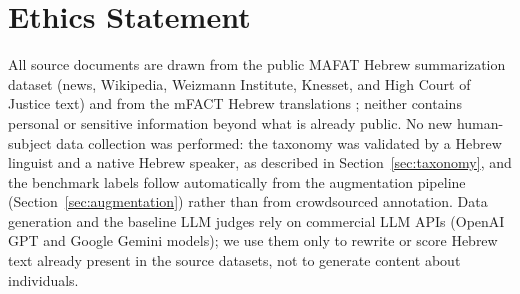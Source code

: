 \documentclass[11pt]{article}
\begin{document}
\section*{Ethics Statement}
All source documents are drawn from the public MAFAT Hebrew summarization dataset \citep{mafat_dataset} (news, Wikipedia, Weizmann Institute, Knesset, and High Court of Justice text) and from the mFACT Hebrew translations \citep{qiu2023detecting}; neither contains personal or sensitive information beyond what is already public. No new human-subject data collection was performed: the taxonomy was validated by a Hebrew linguist and a native Hebrew speaker, as described in Section~\ref{sec:taxonomy}, and the benchmark labels follow automatically from the augmentation pipeline (Section~\ref{sec:augmentation}) rather than from crowdsourced annotation. Data generation and the baseline LLM judges rely on commercial LLM APIs (OpenAI GPT and Google Gemini models); we use them only to rewrite or score Hebrew text already present in the source datasets, not to generate content about individuals.



\appendix
\end{document}
